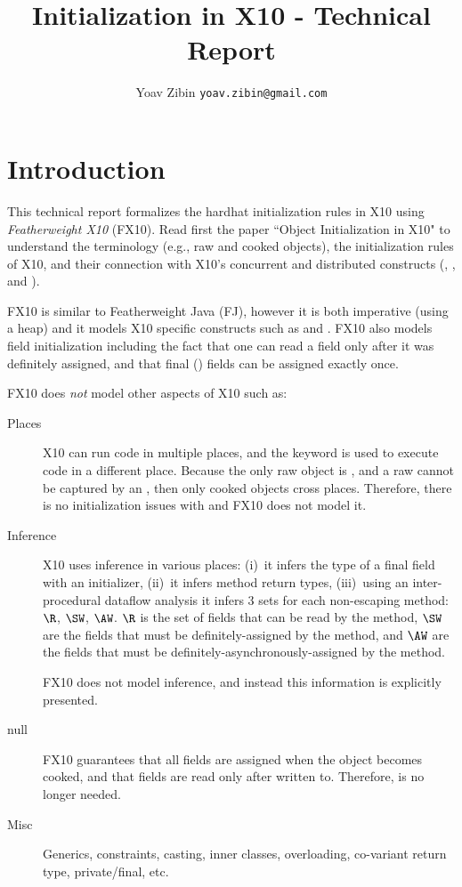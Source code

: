 \documentclass[a4paper]{article}
\title{Initialization in X10 - Technical Report}
\author{Yoav Zibin \texttt{yoav.zibin@gmail.com}}
\date{}
\begin{document}
\maketitle


\lstset{language=java,basicstyle=\ttfamily\small}

\section{Introduction}
This technical report formalizes the hardhat initialization rules in X10
    using \emph{Featherweight X10} (FX10).
Read first the paper ``Object Initialization in X10" to understand
    the terminology (e.g., raw and cooked objects),
    the initialization rules of X10,
    and their connection with X10's concurrent and distributed constructs (\finish, \async, and ).

FX10 is similar to Featherweight Java (FJ), however it is both imperative (using a heap) and it
    models X10 specific constructs such as \finish and \async.
FX10 also models field initialization including the fact that one can read a field only after it was definitely assigned,
    and that final () fields can be assigned exactly once.

FX10 does \emph{not} model other aspects of X10 such as:
\begin{description}
  \item[Places] X10 can run code in multiple places, and the  keyword is used to execute code in a different place.
    Because the only raw object is \this,
        and a raw \this cannot be captured by an ,
        then only cooked objects cross places.
    Therefore, there is no initialization issues with  and FX10 does not model it.
  \item[Inference]
    X10 uses inference in various places:
        (i)~it infers the type of a final field with an initializer,
        (ii)~it infers method return types,
        (iii)~using an inter-procedural dataflow analysis it infers
            3 sets for each non-escaping method: $\R$, $\SW$, $\AW$.
            $\R$ is the set of fields that can be read by the method,
                $\SW$ are the fields that must be definitely-assigned by the method,
                and $\AW$ are the fields that must be definitely-asynchronously-assigned by the method.

    FX10 does not model inference, and instead this information is explicitly presented.
  \item[null]
    FX10 guarantees that all fields are assigned when the object becomes cooked,
        and that fields are read only after written to.
    Therefore, \hnull is no longer needed.

  \item[Misc]
    Generics, constraints, casting, inner classes, overloading, co-variant return type, private/final, etc.
\end{description}
\end{document}
